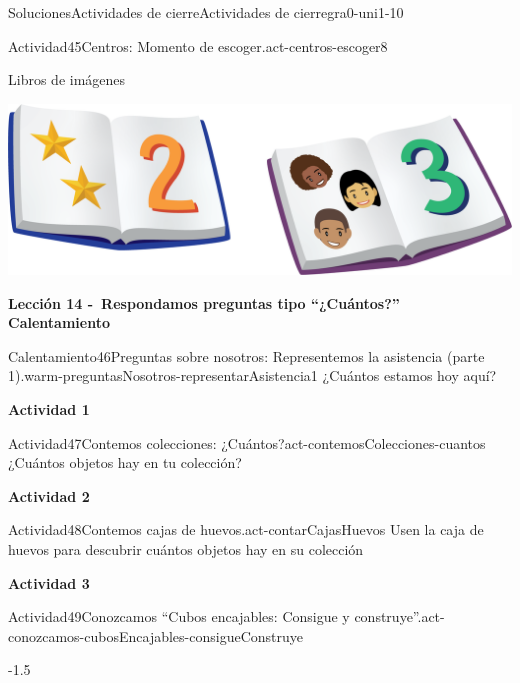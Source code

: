 \documentclass[twoside,10pt,]{article}
\begin{document}
\begin{solutions-section}{Soluciones}{Actividades de cierre}{}{Actividades de cierre}{}{}{gra0-uni1-10}
\begin{activitysolution}{Actividad}{45}{Centros: Momento de escoger.}{act-centros-escoger8}
\begin{sidebyside}{2}{0.025}{0.025}{0.05}
\begin{sbspanel}{0.45}
\end{sbspanel}%
\begin{sbspanel}{0.45}%
Libros de imágenes%
\par
\includegraphics[width=\linewidth]{external/png-source/K.1.D Beta Student Workbooks.Books.png}
\end{sbspanel}%
\end{sidebyside}%
\end{activitysolution}%
\par\medskip
\noindent\textbf{\large{}\space\textperiodcentered\space{}Lección 14 -~Respondamos preguntas tipo “¿Cuántos?”\\
\space\textperiodcentered\space{}Calentamiento}
\begin{explorationsolution}{Calentamiento}{46}{Preguntas sobre nosotros: Representemos la asistencia (parte 1).}{warm-preguntasNosotros-representarAsistencia1}%
¿Cuántos estamos hoy aquí?%
\end{explorationsolution}%
\par\medskip
\noindent\textbf{\large{}\space\textperiodcentered\space{}Actividad 1}
\begin{activitysolution}{Actividad}{47}{Contemos colecciones: ¿Cuántos?}{act-contemosColecciones-cuantos}%
¿Cuántos objetos hay en tu colección?%
\end{activitysolution}%
\par\medskip
\noindent\textbf{\large{}\space\textperiodcentered\space{}Actividad 2}
\begin{activitysolution}{Actividad}{48}{Contemos cajas de huevos.}{act-contarCajasHuevos}%
Usen la caja de huevos para descubrir cuántos objetos hay en su colección%
\end{activitysolution}%
\par\medskip
\noindent\textbf{\large{}\space\textperiodcentered\space{}Actividad 3}
\begin{activitysolution}{Actividad}{49}{Conozcamos “Cubos encajables: Consigue y construye”.}{act-conozcamos-cubosEncajables-consigueConstruye}%
\begin{image}{0}{1}{0}{-1.5\baselineskip}%

\end{image}
\end{activitysolution}
\end{solutions-section}
\end{document}
